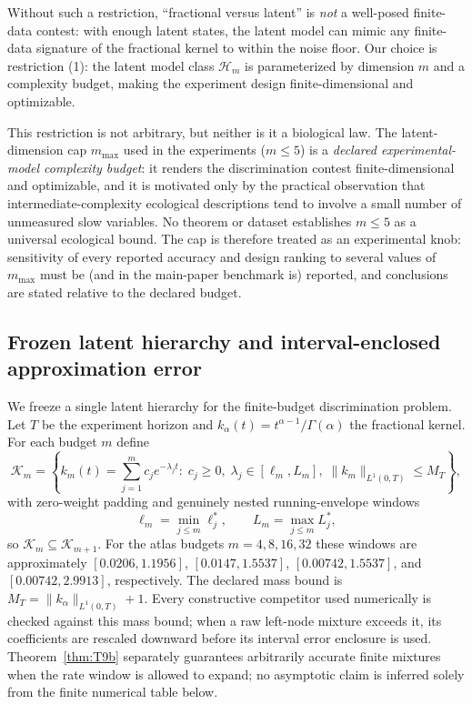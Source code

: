 Without such a restriction, ``fractional versus latent'' is \emph{not} a well-posed finite-data contest: with enough latent states, the latent model can mimic any finite-data signature of the fractional kernel to within the noise floor. Our choice is restriction (1): the latent model class \(\mathcal{H}_m\) is parameterized by dimension \(m\) and a complexity budget, making the experiment design finite-dimensional and optimizable.

This restriction is not arbitrary, but neither is it a biological law. The latent-dimension cap $m_{\max}$ used in the experiments ($m \le 5$) is a \emph{declared experimental-model complexity budget}: it renders the discrimination contest finite-dimensional and optimizable, and it is motivated only by the practical observation that intermediate-complexity ecological descriptions tend to involve a small number of unmeasured slow variables. No theorem or dataset establishes $m \le 5$ as a universal ecological bound. The cap is therefore treated as an experimental knob: sensitivity of every reported accuracy and design ranking to several values of $m_{\max}$ must be (and in the main-paper benchmark is) reported, and conclusions are stated relative to the declared budget.

\subsection{Frozen latent hierarchy and interval-enclosed approximation error}

We freeze a single latent hierarchy for the finite-budget discrimination problem. Let $T$ be the experiment horizon and $k_\alpha(t)=t^{\alpha-1}/\Gamma(\alpha)$ the fractional kernel. For each budget $m$ define
\[
\mathcal K_m
=
\left\{
k_m(t)=\sum_{j=1}^m c_j e^{-\lambda_j t}:\;
c_j\ge0,\;\lambda_j\in[\ell_m,L_m],\;
\|k_m\|_{L^1(0,T)}\le M_T
\right\},
\]
with zero-weight padding and genuinely nested running-envelope windows
\[
\ell_m=\min_{j\le m}\ell_j^*,\qquad L_m=\max_{j\le m}L_j^*,
\]
so $\mathcal K_m\subseteq\mathcal K_{m+1}$. For the atlas budgets $m=4,8,16,32$ these windows are approximately $[0.0206,1.1956]$, $[0.0147,1.5537]$, $[0.00742,1.5537]$, and $[0.00742,2.9913]$, respectively. The declared mass bound is $M_T=\|k_\alpha\|_{L^1(0,T)}+1$. Every constructive competitor used numerically is checked against this mass bound; when a raw left-node mixture exceeds it, its coefficients are rescaled downward before its interval error enclosure is used.  Theorem~\ref{thm:T9b} separately guarantees arbitrarily accurate finite mixtures when the rate window is allowed to expand; no asymptotic claim is inferred solely from the finite numerical table below.

